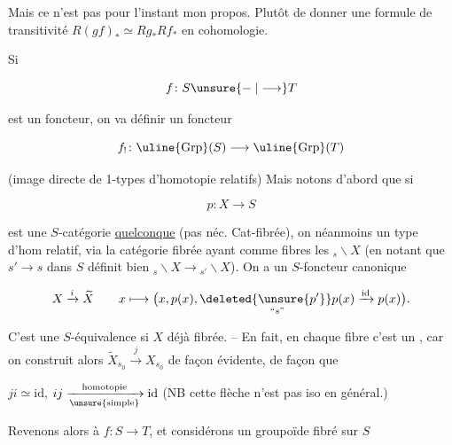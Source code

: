 Mais ce n'est pas pour l'instant mon propos. Plutôt de donner une formule de transitivité     $R(gf)_*\simeq Rg_*Rf_*$ en cohomologie.

Si

\[
f\colon S\unsure{\mathrel{-}|\longrightarrow}T
\]

est un foncteur,  on va définir un foncteur

\[
f_!\colon\uline{\mathrm{Grp}}(S)\longrightarrow\uline{\mathrm{Grp}}(T)
\]

(image directe de 1-types d'homotopie relatifs) Mais notons d'abord que si

\[
p\colon X\longrightarrow S
\]

est une $S$-catégorie \uline{quelconque} (pas néc. Cat-fibrée), on  néanmoins un type d'hom relatif, via la catégorie fibrée  ayant comme fibres les ${}_{s}\backslash X$ (en notant que $s'\longrightarrow s$ dans $S$ définit bien ${}_{s}\backslash X\longrightarrow {}_{s'}\backslash X$).  On a un $S$-foncteur canonique


\[
X\xrightarrow{i}\widetilde X\qquad
x\longmapsto\bigl(x,p(x),\underset{\text{``}s\text{''}}{\deleted{\unsure{p'}}p(x)}\xrightarrow{\mathrm{id}}p(x)\bigr).
\]

 C'est une $S$-équivalence si $X$  déjà fibrée. -- En fait, en chaque fibre c'est un  , car on construit alors $\widetilde X_{s_0}\xrightarrow{j}X_{s_0}$ de façon évidente, de façon que


$ji\simeq\mathrm{id}$, $ij\xrightarrow[\text{\unsure{simple}}]{\text{homotopie}}\mathrm{id}$ (NB cette flèche n'est pas iso en général.)

Revenons alors à $f\colon S\longrightarrow T$, et considérons un groupoïde fibré sur $S$

